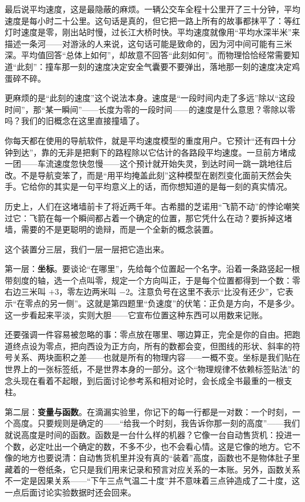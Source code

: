 最后说平均速度，这是最隐蔽的麻烦。一辆公交车全程十公里开了三十分钟，平均速度是每小时二十公里。这句话是真的，但它把一路上所有的故事都抹平了：等红灯时速度是零，刚出站时慢，过长江大桥时快。平均速度就像用“平均水深半米”来描述一条河——对游泳的人来说，这句话可能是致命的，因为河中间可能有三米深。平均值回答“总体上如何”，却故意不回答“此刻如何”。而物理恰恰经常需要知道“此刻”：撞车那一刻的速度决定安全气囊要不要弹出，落地那一刻的速度决定鸡蛋碎不碎。

更麻烦的是“此刻的速度”这个说法本身。速度是“一段时间内走了多远”除以“这段时间”，那“某一瞬间”——长度为零的一段时间——的速度是什么意思？零除以零吗？我们的旧概念在这里直接撞墙了。

你每天都在使用的导航软件，就是平均速度模型的重度用户。它预计“还有四十分钟到达”，靠的无非是把剩下的路程除以它估计的各路段平均速度。一旦前方堵成一团——车流速度忽快忽慢——这个预计就开始失灵，到达时间一跳一跳地往后改。不是导航变笨了，而是“用平均掩盖此刻”这种模型在剧烈变化面前天然会失手。它给你的其实是一句平均意义上的话，而你想知道的是每一刻的真实情况。

历史上，人们在这堵墙前卡了将近两千年。古希腊的芝诺用“飞箭不动”的悖论嘲笑过它：飞箭在每一个瞬间都占着一个确定的位置，那它凭什么在动？要拆掉这堵墙，需要的不是更聪明的诡辩，而是一个全新的概念装置。


这个装置分三层，我们一层一层把它造出来。

第一层：\textbf{坐标}。要谈论“在哪里”，先给每个位置起一个名字。沿着一条路竖起一根带刻度的轴，选一个点叫零，规定一个方向叫正，于是每个位置都得到一个数：零右边三米叫 \(+3\)，零左边两米叫 \(-2\)。注意负号在这里不表示“比没有还少”，它表示“在零点的另一侧”。这就是第四题里“负速度”的伏笔：正负是方向，不是多少。这一步看起来平淡，实则大胆——它宣布位置这种东西可以用数来记账。

还要强调一件容易被忽略的事：零点放在哪里、哪边算正，完全是你的自由。把跑道终点设为零点，把向西设为正方向，所有的数都会变，但图线的形状、斜率的符号关系、两块面积之差——也就是所有的物理内容——一概不变。坐标是我们贴在世界上的一张标签纸，不是世界本身的一部分。这个“物理规律不依赖标签贴法”的念头现在看着不起眼，到后面讨论参考系和相对论时，会长成全书最重的一根支柱。

第二层：\textbf{变量与函数}。在滴漏实验里，你记下的每一行都是一对数：一个时刻，一个高度。只要规则是确定的——“给我一个时刻，我告诉你那一刻的高度”——我们就说高度是时间的函数。函数是一台什么样的机器？它像一台自动售货机：投进一个数，必定吐出一个确定的数，不多不少，也不会看心情。这是它像的地方。它不像的地方也要说清：自动售货机里并没有真的“装着”高度，函数也不是物体肚子里藏着的一卷纸条，它只是我们用来记录和预言对应关系的一本账。另外，函数关系不一定是因果关系——“下午三点气温二十度”并不意味着三点钟造成了二十度，这一点后面讨论实验数据时还会回来。

